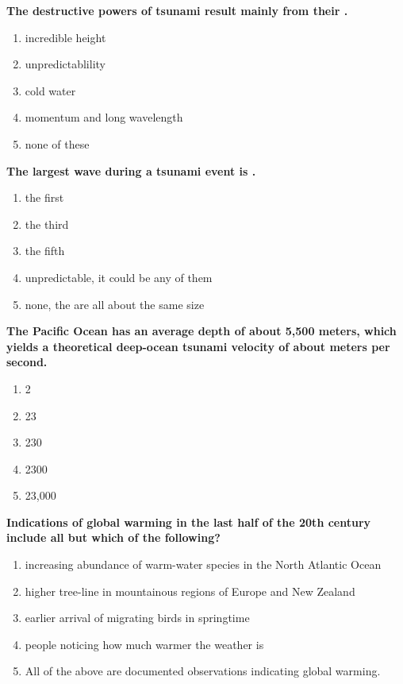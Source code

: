\item {
\setlength{\itemsep}{0cm}
\setlength{\parskip}{.2cm}
\begin{samepage}
\textbf{
The destructive powers of tsunami result mainly from their \makebox[1cm]{\Rivpt\hrulefill\Rivpt}.
}
\begin{enumerate}
\item { 	incredible height }
\item { 	unpredictablility }
\item { 	cold water }
\item { 	momentum and long wavelength }
\item { 	none of these 		 }
\end{enumerate}
\end{samepage}
}
\item {
\setlength{\itemsep}{0cm}
\setlength{\parskip}{.2cm}
\begin{samepage}
\textbf{
The largest wave during a tsunami event is \makebox[1cm]{\Rivpt\hrulefill\Rivpt}.
}
\begin{enumerate}
\item { 	the first }
\item { 	the third }
\item { 	the fifth }
\item { 	unpredictable, it could be any of them }
\item { 	none, the are all about the same size 		 }
\end{enumerate}
\end{samepage}
}
\item {
\setlength{\itemsep}{0cm}
\setlength{\parskip}{.2cm}
\begin{samepage}
\textbf{
The Pacific Ocean has an average depth of about 5,500 meters, which yields a theoretical deep-ocean tsunami velocity of about \makebox[1cm]{\Rivpt\hrulefill\Rivpt} meters per second.
}
\begin{enumerate}
\item { 	2 }
\item { 	23 }
\item { 	230 }
\item { 	2300 }
\item { 	23,000 		 }
\end{enumerate}
\end{samepage}
}
\item {
\setlength{\itemsep}{0cm}
\setlength{\parskip}{.2cm}
\begin{samepage}
\textbf{
Indications of global warming in the last half of the 20th century include all but which of the following?
}
\begin{enumerate}
\item {  increasing abundance of warm-water species in the North Atlantic Ocean }
\item {  higher tree-line in mountainous regions of Europe and New Zealand }
\item {  earlier arrival of migrating birds in springtime }
\item {  people noticing how much warmer the weather is }
\item {  All of the above are documented observations indicating global warming. }
\end{enumerate}
\end{samepage}
}
